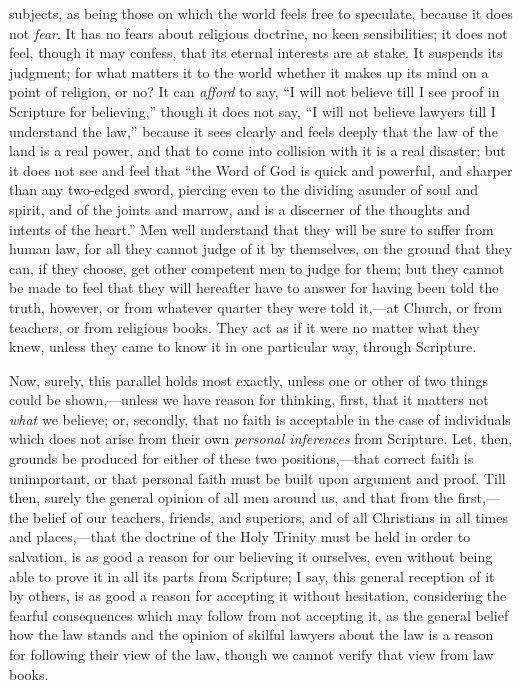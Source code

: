 subjects, as being those on which the world feels free to speculate,
because it does not \emph{fear}. It has no fears about religious
doctrine, no keen sensibilities; it does not feel, though it may
confess, that its eternal interests are at stake. It suspends its
judgment; for what matters it to the world whether it makes up its
mind on a point of religion, or no? It can \emph{afford} to say,
``I will not believe till I see proof in Scripture for
believing,'' though it does not say, ``I will not believe
lawyers till I understand the law,'' because it sees clearly and
feels deeply that the law of the land is a real power, and that to
come into collision with it is a real disaster; but it does not see
and feel that ``the Word of God is quick and powerful, and sharper
than any two-edged sword, piercing even to the dividing asunder of
soul and spirit, and of the joints and marrow, and is a discerner of
the thoughts and intents of the heart.'' Men well understand that
they will be sure to suffer from human law, for all they cannot judge
of it by themselves, on the ground that they can, if they choose, get
other competent men to judge for them; but they cannot be made to feel
that they will hereafter have to answer for having been told the
truth, however, or from whatever quarter they were told it,—at
Church, or from teachers, or from religious books. They act as if it
were no matter what they knew, unless they came to know it in one
particular way, through Scripture.

Now, surely, this parallel holds most exactly, unless one or other
of two things could be shown,—unless we have reason for thinking,
first, that it matters not \emph{what} we believe; or, secondly, that
no faith is acceptable in the case of individuals which does not arise
from their own \emph{personal inferences} from Scripture. Let, then,
grounds be produced for either of these two positions,—that correct
faith is unimportant, or that personal faith must be built upon
argument and proof. Till then, surely the general opinion of all men
around us, and that from the first,—the belief of our teachers,
friends, and superiors, and of all Christians in all times and places,—that
the doctrine of the Holy Trinity must be held in order to salvation,
is as good a reason for our believing it ourselves, even without being
able to prove it in all its parts from Scripture; I say, this general
reception of it by others, is as good a reason for accepting it without hesitation, considering the fearful consequences which may
follow from not accepting it, as the general belief how the law stands
and the opinion of skilful lawyers about the law is a reason for
following their view of the law, though we cannot verify that view
from law books.

